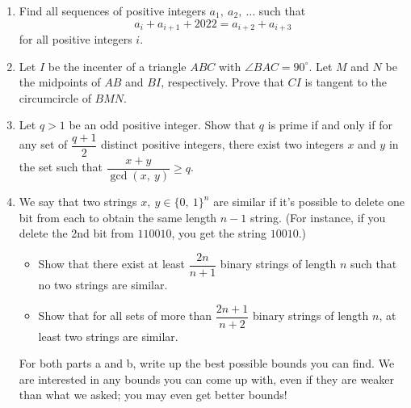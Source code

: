 \documentclass{article}
\begin{document}
\begin{enumerate}
  \item Find all sequences of positive integers $a_1,\ a_2,\ \ldots$ such that
  \[
    a_i + a_{i+1} + 2022 = a_{i+2} + a_{i+3}
  \]
  for all positive integers $i$.
  \item Let $I$ be the incenter of a triangle $ABC$ with $\angle BAC = 90^\circ$. Let $M$ and $N$ be the midpoints of $AB$ and $BI$, respectively. Prove that $CI$ is tangent to the circumcircle of $BMN$.
  \item Let $q > 1$ be an odd positive integer. Show that $q$ is prime if and only if for any set of $\dfrac{q+1}{2}$ distinct positive integers, there exist two integers $x$ and $y$ in the set such that $\dfrac{x+y}{\gcd (x,\ y)} \geq q$.
  \item We say that two strings $x,\ y \in \{0,\ 1\}^n$ are similar if it’s possible to delete one bit from each to obtain the same length $n-1$ string. (For instance, if you delete the 2nd bit from $110010$, you get the string $10010$.)
  \begin{itemize}
    \item Show that there exist at least $\dfrac{2n}{n+1}$ binary strings of length $n$ such that no two strings are similar.
    \item Show that for all sets of more than $\dfrac{2n+1}{n+2}$ binary strings of length $n$, at least two strings are similar.
  \end{itemize}
  For both parts a and b, write up the best possible bounds you can find. We are interested in any bounds you can come up with, even if they are weaker than what we asked; you may even get better bounds!
  
\end{enumerate}
\end{document}
